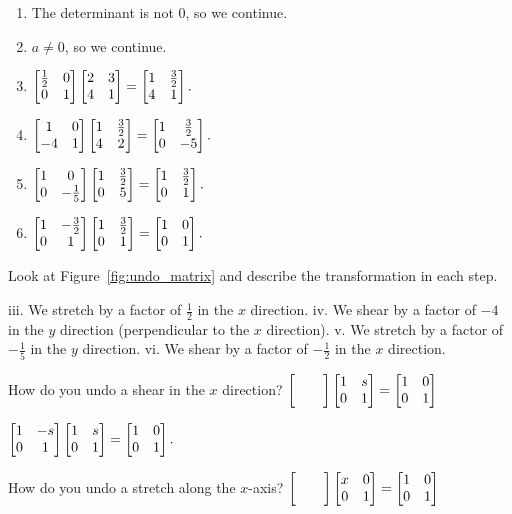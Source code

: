 \documentclass[../gatm_answers.tex]{subfiles}
\begin{document}
\begin{iinner_problem}
\begin{iinner_problem}
\begin{iinner_problem}
\begin{minipage}{0.5\textwidth}
\end{minipage}\hfill
\begin{minipage}{0.5\textwidth}
\begin{enumerate}[label=\roman*.]
\item The determinant is not $0$, so we continue.
\item $a\neq 0$, so we continue.
\item $\begin{bmatrix} \frac{1}{2} & 0 \\ 0 & 1 \end{bmatrix}\begin{bmatrix} 2 & 3 \\ 4 & 1 \end{bmatrix}=\begin{bmatrix} 1 & \frac{3}{2} \\ 4 & 1 \end{bmatrix}.$
\item $\begin{bmatrix} 1 & 0 \\ -4 & 1 \end{bmatrix}\begin{bmatrix} 1 & \frac{3}{2} \\ 4 & 2 \end{bmatrix}=\begin{bmatrix} 1 & \frac{3}{2} \\ 0 & -5 \end{bmatrix}.$
\item $\begin{bmatrix} 1 & 0 \\ 0 & -\frac{1}{5} \end{bmatrix}\begin{bmatrix} 1 & \frac{3}{2} \\ 0 & 5 \end{bmatrix}=\begin{bmatrix} 1 & \frac{3}{2} \\ 0 & 1 \end{bmatrix}.$
\item $\begin{bmatrix} 1 & -\frac{3}{2} \\ 0 & 1 \end{bmatrix}\begin{bmatrix} 1 & \frac{3}{2} \\ 0 & 1 \end{bmatrix}=\begin{bmatrix} 1 & 0 \\ 0 & 1 \end{bmatrix}.$
\end{enumerate}
\end{minipage}

\begin{outer_problem}
\item Look at Figure~\ref{fig:undo_matrix} and describe the transformation in each step.
\end{outer_problem}

iii. We stretch by a factor of $\frac{1}{2}$ in the $x$ direction.
iv. We shear by a factor of $-4$ in the $y$ direction (perpendicular to the $x$ direction).
v. We stretch by a factor of $-\frac{1}{5}$ in the $y$ direction.
vi. We shear by a factor of $-\frac{1}{2}$ in the $x$ direction.

\begin{outer_problem}
\item
\end{outer_problem}

\begin{inner_problem}[start=1]
\item How do you undo a shear in the $x$ direction?
$\blanktwomat\twomat{1}{s}{0}{1}=\twomat{1}{0}{0}{1}$
\end{inner_problem}

$\begin{bmatrix} 1 & -s \\ 0 & 1 \end{bmatrix}\begin{bmatrix} 1 & s \\ 0 & 1 \end{bmatrix}=\begin{bmatrix} 1 & 0 \\ 0 & 1 \end{bmatrix}.$

\begin{inner_problem}
\item How do you undo a stretch along the $x$-axis?
$\blanktwomat\twomat{x}{0}{0}{1}=\twomat{1}{0}{0}{1}$
\end{inner_problem}


\end{iinner_problem}
\end{iinner_problem}
\end{iinner_problem}
\end{document}

